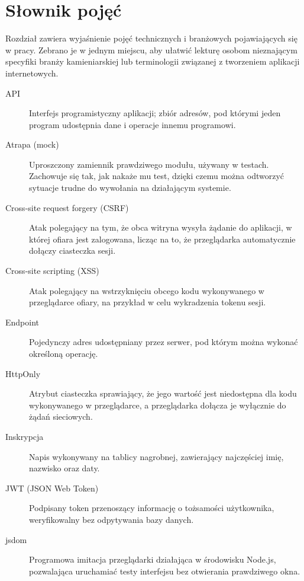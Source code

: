 \chapter{Słownik pojęć}
\label{cha:slownik}

Rozdział zawiera wyjaśnienie pojęć technicznych i branżowych pojawiających się w pracy. Zebrano je w jednym miejscu, aby ułatwić lekturę osobom nieznającym specyfiki branży kamieniarskiej lub terminologii związanej z tworzeniem aplikacji internetowych.

\begin{description}

\item[API] Interfejs programistyczny aplikacji; zbiór adresów, pod którymi jeden program udostępnia dane i operacje innemu programowi.

\item[Atrapa (mock)] Uproszczony zamiennik prawdziwego modułu, używany w testach. Zachowuje się tak, jak nakaże mu test, dzięki czemu można odtworzyć sytuacje trudne do wywołania na działającym systemie.

\item[Cross-site request forgery (CSRF)] Atak polegający na tym, że obca witryna wysyła żądanie do aplikacji, w której ofiara jest zalogowana, licząc na to, że przeglądarka automatycznie dołączy ciasteczka sesji.

\item[Cross-site scripting (XSS)] Atak polegający na wstrzyknięciu obcego kodu wykonywanego w przeglądarce ofiary, na przykład w celu wykradzenia tokenu sesji.

\item[Endpoint] Pojedynczy adres udostępniany przez serwer, pod którym można wykonać określoną operację.

\item[HttpOnly] Atrybut ciasteczka sprawiający, że jego wartość jest niedostępna dla kodu wykonywanego w przeglądarce, a przeglądarka dołącza je wyłącznie do żądań sieciowych.

\item[Inskrypcja] Napis wykonywany na tablicy nagrobnej, zawierający najczęściej imię, nazwisko oraz daty.

\item[JWT (JSON Web Token)] Podpisany token przenoszący informację o tożsamości użytkownika, weryfikowalny bez odpytywania bazy danych.

\item[jsdom] Programowa imitacja przeglądarki działająca w środowisku Node.js, pozwalająca uruchamiać testy interfejsu bez otwierania prawdziwego okna.


\end{description}
